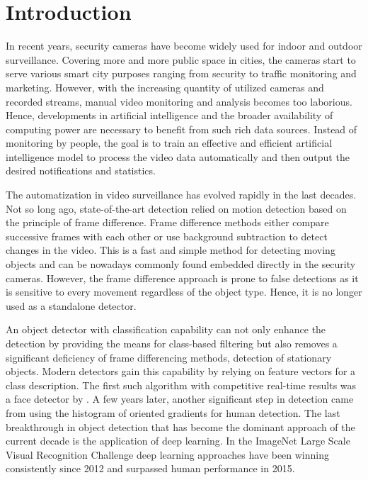 \chapter*{Introduction}

In recent years, security cameras have become widely used for indoor and outdoor surveillance. Covering more and more public space in cities, the cameras start to serve various smart city purposes ranging from security to traffic monitoring and marketing. However, with the increasing quantity of utilized cameras and recorded streams, manual video monitoring and analysis becomes too laborious. Hence, developments in artificial intelligence and the broader availability of computing power are necessary to benefit from such rich data sources. Instead of monitoring by people, the goal is to train an effective and efficient artificial intelligence model to process the video data automatically and then output the desired notifications and statistics.

The automatization in video surveillance has evolved rapidly in the last decades. Not so long ago, state-of-the-art detection relied on motion detection based on the principle of frame difference. Frame difference methods either compare successive frames with each other or use background subtraction to detect changes in the video. This is a fast and simple method for detecting moving objects and can be nowadays commonly found embedded directly in the security cameras. However, the frame difference approach is prone to false detections as it is sensitive to every movement regardless of the object type. Hence, it is no longer used as a standalone detector.

An object detector with classification capability can not only enhance the detection by providing the means for class-based filtering but also removes a significant deficiency of frame differencing methods, detection of stationary objects.  Modern detectors gain this capability by relying on feature vectors for a class description. The first such algorithm with competitive real-time results was a face detector by \citeauthor{bib:viola}. A few years later, another significant step in detection came from \citeauthor{bib:hog} using the histogram of oriented gradients for human detection. The last breakthrough in object detection that has become the dominant approach of the current decade is the application of deep learning. In the ImageNet Large Scale Visual Recognition Challenge deep learning approaches have been winning consistently since 2012 and surpassed human performance in 2015.


